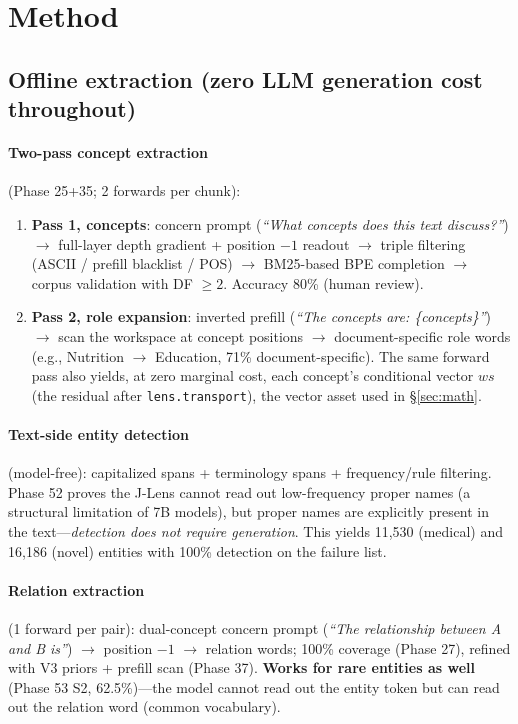 \section{Method}
\label{sec:method}

\subsection{Offline extraction (zero LLM generation cost throughout)}
\label{sec:method:offline}

\paragraph{Two-pass concept extraction} (Phase 25+35; 2 forwards per chunk):
\begin{enumerate}
\item \textbf{Pass 1, concepts}: concern prompt (\emph{``What concepts does this
text discuss?''}) $\to$ full-layer depth gradient + position $-1$ readout
$\to$ triple filtering (ASCII / prefill blacklist / POS) $\to$ BM25-based BPE
completion $\to$ corpus validation with DF $\geq 2$. Accuracy 80\% (human
review).
\item \textbf{Pass 2, role expansion}: inverted prefill (\emph{``The concepts
are: \{concepts\}''}) $\to$ scan the workspace at concept positions $\to$
document-specific role words (e.g., Nutrition $\to$ Education, 71\%
document-specific). The same forward pass also yields, at zero marginal cost,
each concept's conditional vector $ws$ (the residual after
\texttt{lens.transport}), the vector asset used in \S\ref{sec:math}.
\end{enumerate}

\paragraph{Text-side entity detection} (model-free): capitalized spans +
terminology spans + frequency/rule filtering. Phase 52 proves the J-Lens
cannot read out low-frequency proper names (a structural limitation of 7B
models), but proper names are explicitly present in the
text---\emph{detection does not require generation}. This yields 11{,}530
(medical) and 16{,}186 (novel) entities with 100\% detection on the failure
list.

\paragraph{Relation extraction} (1 forward per pair): dual-concept concern
prompt (\emph{``The relationship between A and B is''}) $\to$ position $-1$
$\to$ relation words; 100\% coverage (Phase 27), refined with V3 priors +
prefill scan (Phase 37). \textbf{Works for rare entities as well} (Phase 53
S2, 62.5\%)---the model cannot read out the entity token but can read out the
relation word (common vocabulary).

